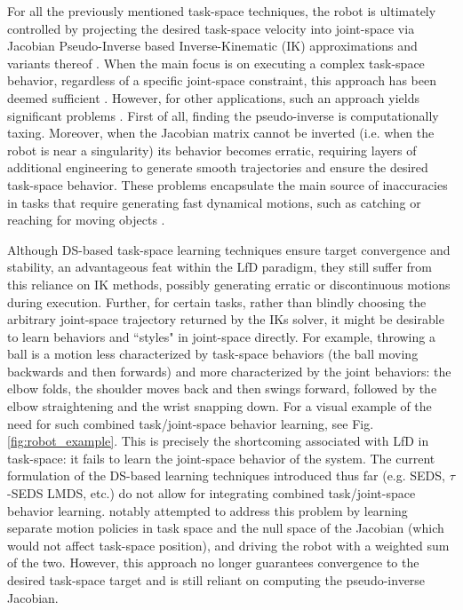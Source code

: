\documentclass[letterpaper, 10 pt, conference,fleqn]{ieeeconf}
\begin{document}
For all the previously mentioned task-space techniques, the robot is ultimately controlled by projecting the desired task-space velocity into joint-space via Jacobian Pseudo-Inverse based Inverse-Kinematic (IK) approximations and variants thereof \cite{kelly2006control}. When the main focus is on executing a complex task-space behavior, regardless of a specific joint-space constraint, this approach has been deemed sufficient \cite{figueroa2016HRIrolling,ureche2015taskconst}. However, for other applications, such an approach yields significant problems \cite{buss2004introduction}. First of all, finding the pseudo-inverse is computationally taxing. Moreover, when the Jacobian matrix cannot be inverted (i.e. when the robot is near a singularity) its behavior becomes erratic, requiring layers of additional engineering to generate smooth trajectories and ensure the desired task-space behavior. These problems encapsulate the main source of inaccuracies in tasks that require generating fast dynamical motions, such as catching or reaching for moving objects \cite{7439839,Salehian-RSS-16}. 

Although DS-based task-space learning techniques ensure target convergence and stability, an advantageous feat within the LfD paradigm, they still suffer from this reliance on IK methods, possibly generating erratic or discontinuous motions during execution. Further, for certain tasks, rather than blindly choosing the arbitrary joint-space trajectory returned by the IKs solver, it might be desirable to learn behaviors and ``styles" in joint-space directly.  For example, throwing a ball is a motion less characterized by task-space behaviors (the ball moving backwards and then forwards) and more characterized by the joint behaviors: the elbow folds, the shoulder moves back and then swings forward, followed by the elbow straightening and the wrist snapping down. For a visual example of the need for such combined task/joint-space behavior learning, see Fig. \ref{fig:robot_example}. This is precisely the shortcoming associated with LfD in task-space: it fails to learn the joint-space behavior of the system. The current formulation of the DS-based learning techniques introduced thus far (e.g. SEDS, $\tau$-SEDS LMDS, etc.) do not allow for integrating combined task/joint-space behavior learning. \cite{calinon2008probabilistic} notably attempted to address this problem by learning separate motion policies in task space and the null space of the Jacobian (which would not affect task-space position), and driving the robot with a weighted sum of the two. However, this approach no longer guarantees convergence to the desired task-space target and is still reliant on computing the pseudo-inverse Jacobian. 
\end{document}
